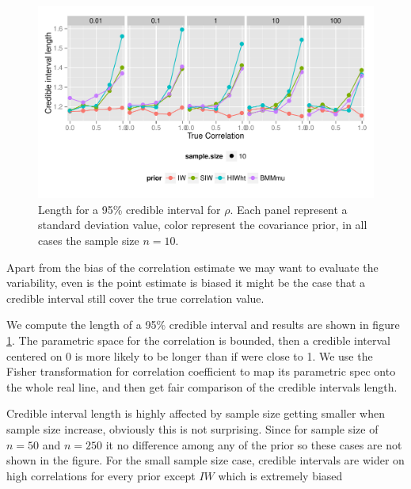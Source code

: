 \documentclass{article}
\begin{document}
\begin{figure}[htbp]
   \centering
   \includegraphics[width=\textwidth]{cilength} %
    \vspace{-.5in}
   \caption{Length for a 95\% credible interval for $\rho$. Each panel represent a standard deviation value,  color represent the covariance prior, in all cases the sample size $n=10$.  \label{cilength} }
\end{figure}

Apart from the bias of the correlation estimate we may want to evaluate the variability, even is the point estimate is biased it might be the case that a credible interval still cover the true correlation value.  

We compute the length of a 95\% credible interval and results are shown in figure \ref{cilength}. The parametric space for the correlation is bounded, then a credible interval centered on 0 is more likely to be longer than if were close to 1. We use the Fisher transformation for correlation coefficient to  map its parametric spec onto the whole real line, and then get fair comparison of the credible intervals length. 

Credible interval length is highly affected by sample size getting smaller when sample size increase,  obviously this is not surprising. Since for sample size of $n=50$ and $n=250$ it no difference among any of the prior so these cases are not shown in the figure. For the small sample size case, credible intervals are wider on high correlations for every prior except $IW$ which is extremely biased
\end{document}
